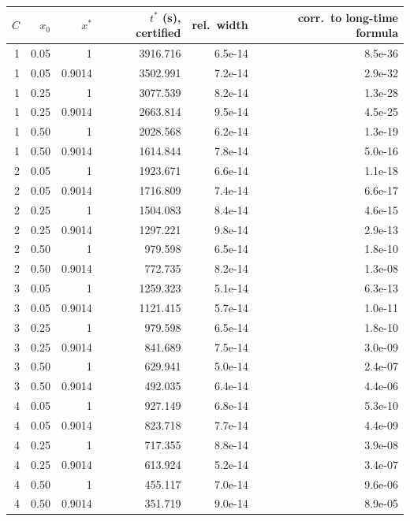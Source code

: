 \begin{tabular}{rrrrrr}
\toprule
$C$ & $x_0$ & $x^*$ & $t^*$ (s), certified & rel.\ width & corr.\ to long-time formula \\
\midrule
1 & 0.05 & 1 & 3916.716 & 6.5e-14 & 8.5e-36 \\
1 & 0.05 & 0.9014 & 3502.991 & 7.2e-14 & 2.9e-32 \\
1 & 0.25 & 1 & 3077.539 & 8.2e-14 & 1.3e-28 \\
1 & 0.25 & 0.9014 & 2663.814 & 9.5e-14 & 4.5e-25 \\
1 & 0.50 & 1 & 2028.568 & 6.2e-14 & 1.3e-19 \\
1 & 0.50 & 0.9014 & 1614.844 & 7.8e-14 & 5.0e-16 \\
2 & 0.05 & 1 & 1923.671 & 6.6e-14 & 1.1e-18 \\
2 & 0.05 & 0.9014 & 1716.809 & 7.4e-14 & 6.6e-17 \\
2 & 0.25 & 1 & 1504.083 & 8.4e-14 & 4.6e-15 \\
2 & 0.25 & 0.9014 & 1297.221 & 9.8e-14 & 2.9e-13 \\
2 & 0.50 & 1 & 979.598 & 6.5e-14 & 1.8e-10 \\
2 & 0.50 & 0.9014 & 772.735 & 8.2e-14 & 1.3e-08 \\
3 & 0.05 & 1 & 1259.323 & 5.1e-14 & 6.3e-13 \\
3 & 0.05 & 0.9014 & 1121.415 & 5.7e-14 & 1.0e-11 \\
3 & 0.25 & 1 & 979.598 & 6.5e-14 & 1.8e-10 \\
3 & 0.25 & 0.9014 & 841.689 & 7.5e-14 & 3.0e-09 \\
3 & 0.50 & 1 & 629.941 & 5.0e-14 & 2.4e-07 \\
3 & 0.50 & 0.9014 & 492.035 & 6.4e-14 & 4.4e-06 \\
4 & 0.05 & 1 & 927.149 & 6.8e-14 & 5.3e-10 \\
4 & 0.05 & 0.9014 & 823.718 & 7.7e-14 & 4.4e-09 \\
4 & 0.25 & 1 & 717.355 & 8.8e-14 & 3.9e-08 \\
4 & 0.25 & 0.9014 & 613.924 & 5.2e-14 & 3.4e-07 \\
4 & 0.50 & 1 & 455.117 & 7.0e-14 & 9.6e-06 \\
4 & 0.50 & 0.9014 & 351.719 & 9.0e-14 & 8.9e-05 \\
\bottomrule
\end{tabular}
